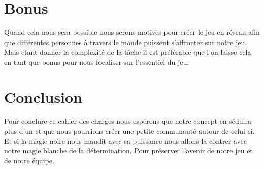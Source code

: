 \documentclass[12pt]{extarticle}
\begin{document}
\newpage

\section{Bonus}

Quand cela nous sera possible nous serons motivés pour créer le jeu en réseau afin que différentes personnes à travers le monde puissent s’affronter sur notre jeu. Mais étant donner la complexité de la tâche il est préférable que l’on laisse cela en tant que bonus pour nous focaliser sur l’essentiel du jeu.

\section{Conclusion}

Pour conclure ce cahier des charges nous espérons que notre concept en séduira plus d’un et que nous pourrions créer une petite communauté autour de celui-ci. Et si la magie noire nous maudit avec sa puissance nous allons la contrer avec notre magie blanche de la détermination. Pour préserver l’avenir de notre jeu et de notre équipe.
\end{document}

